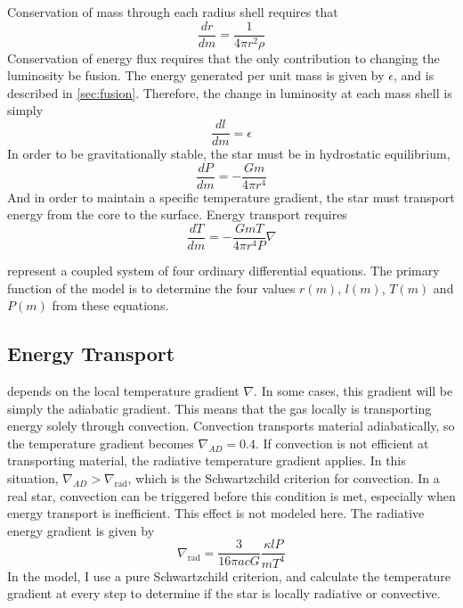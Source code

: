 \documentclass[10pt]{article}
\newcommand{\txt}{\textrm} %
\begin{document}
Conservation of mass through each radius shell requires that
\begin{equation} \label{eqn:consvofmass}
\frac{dr}{dm} = \frac{1}{4\pi r^2 \rho}
\end{equation}
Conservation of energy flux requires that the only contribution to changing the luminosity be fusion. The energy generated per unit mass is given by $\epsilon$, and is described in \cref{sec:fusion}. Therefore, the change in luminosity at each mass shell is simply
\begin{equation}\label{eqn:fusion}
\frac{dl}{dm} = \epsilon
\end{equation}
In order to be gravitationally stable, the star must be in hydrostatic equilibrium,
\begin{equation}\label{eqn:hydrostatic}
\frac{dP}{dm} = -\frac{Gm}{4\pi r^4}
\end{equation}
And in order to maintain a specific temperature gradient, the star must transport energy from the core to the surface. Energy transport requires
\begin{equation}\label{eqn:energytransport}
\frac{dT}{dm} = - \frac{GmT}{4\pi r^4 P} \nabla
\end{equation}

 represent a coupled system of four ordinary differential equations. The primary function of the model is to determine the four values $r(m)$, $l(m)$, $T(m)$ and $P(m)$ from these equations.

\subsection{Energy Transport} \label{sec:energytransport}
 depends on the local temperature gradient $\nabla$. In some cases, this gradient will be simply the adiabatic gradient. This means that the gas locally is transporting energy solely through convection. Convection transports material adiabatically, so the temperature gradient becomes $\nabla_{AD} = 0.4$. If convection is not efficient at transporting material, the radiative temperature gradient applies. In this situation, $\nabla_{AD} > \nabla_\txt{rad}$, which is the Schwartzchild criterion for convection. In a real star, convection can be triggered before this condition is met, especially when energy transport is inefficient. This effect is not modeled here. The radiative energy gradient is given by
\begin{equation}\label{eqn:delrad}
\nabla_\txt{rad} = \frac{3}{16 \pi a c G} \frac{\kappa l P}{ m T^4}
\end{equation}
In the model, I use a pure Schwartzchild criterion, and calculate the temperature gradient at every step to determine if the star is locally radiative or convective.
\end{document}
